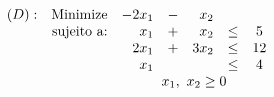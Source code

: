 \documentclass[12pt]{exam}
\begin{document}
\begin{questions}
\question \ \\


	\begin{equation*}	
				\begin{array}{c r r c r c c }
			(D) :&  \text{Minimize}   & -2x_1 & -  & x_2 \\
			& \text{sujeito a:} &  x_1 & + &  x_2  & \leq & 5 \\
			&                   & 2x_1 & + & 3x_2  & \leq & 12 \\
			&                   &  x_1 &   &       & \leq & 4 \\
			&                   & \multicolumn{5}{c}{x_1,~x_2 \geq 0}
			\end{array}
	\end{equation*}

\end{questions}
\end{document}
